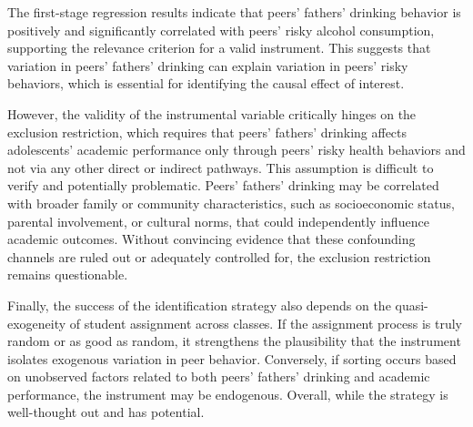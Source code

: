 



The first-stage regression results indicate that peers' fathers' drinking behavior is positively and significantly correlated with peers' risky alcohol consumption, supporting the relevance criterion for a valid instrument. This suggests that variation in peers' fathers' drinking can explain variation in peers' risky behaviors, which is essential for identifying the causal effect of interest. 

However, the validity of the instrumental variable critically hinges on the exclusion restriction, which requires that peers' fathers' drinking affects adolescents' academic performance only through peers' risky health behaviors and not via any other direct or indirect pathways. This assumption is difficult to verify and potentially problematic. Peers' fathers' drinking may be correlated with broader family or community characteristics, such as socioeconomic status, parental involvement, or cultural norms, that could independently influence academic outcomes. Without convincing evidence that these confounding channels are ruled out or adequately controlled for, the exclusion restriction remains questionable. 

Finally, the success of the identification strategy also depends on the quasi-exogeneity of student assignment across classes. If the assignment process is truly random or as good as random, it strengthens the plausibility that the instrument isolates exogenous variation in peer behavior. Conversely, if sorting occurs based on unobserved factors related to both peers' fathers' drinking and academic performance, the instrument may be endogenous. Overall, while the strategy is well-thought out and has potential.
